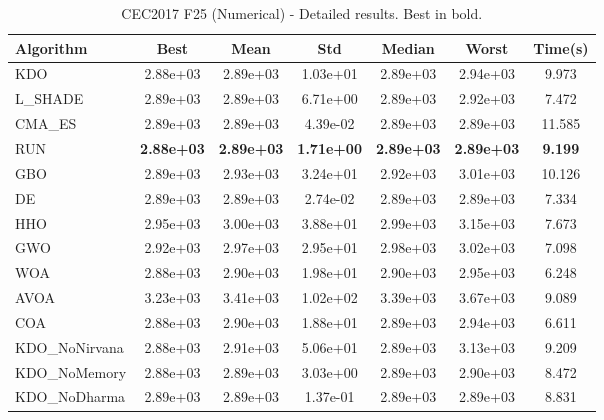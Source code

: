 \begin{table}[H]
\centering\small
\caption{CEC2017 F25 (Numerical) - Detailed results. Best in bold.}
\label{tab:cec2017_F25}
\begin{tabular}{lcccccc}
\toprule
\textbf{Algorithm} & \textbf{Best} & \textbf{Mean} & \textbf{Std} & \textbf{Median} & \textbf{Worst} & \textbf{Time(s)} \\
\midrule
KDO & 2.88e+03 & 2.89e+03 & 1.03e+01 & 2.89e+03 & 2.94e+03 & 9.973 \\
L_SHADE & 2.89e+03 & 2.89e+03 & 6.71e+00 & 2.89e+03 & 2.92e+03 & 7.472 \\
CMA_ES & 2.89e+03 & 2.89e+03 & 4.39e-02 & 2.89e+03 & 2.89e+03 & 11.585 \\
RUN & \textbf{2.88e+03} & \textbf{2.89e+03} & \textbf{1.71e+00} & \textbf{2.89e+03} & \textbf{2.89e+03} & \textbf{9.199} \\
GBO & 2.89e+03 & 2.93e+03 & 3.24e+01 & 2.92e+03 & 3.01e+03 & 10.126 \\
DE & 2.89e+03 & 2.89e+03 & 2.74e-02 & 2.89e+03 & 2.89e+03 & 7.334 \\
HHO & 2.95e+03 & 3.00e+03 & 3.88e+01 & 2.99e+03 & 3.15e+03 & 7.673 \\
GWO & 2.92e+03 & 2.97e+03 & 2.95e+01 & 2.98e+03 & 3.02e+03 & 7.098 \\
WOA & 2.88e+03 & 2.90e+03 & 1.98e+01 & 2.90e+03 & 2.95e+03 & 6.248 \\
AVOA & 3.23e+03 & 3.41e+03 & 1.02e+02 & 3.39e+03 & 3.67e+03 & 9.089 \\
COA & 2.88e+03 & 2.90e+03 & 1.88e+01 & 2.89e+03 & 2.94e+03 & 6.611 \\
KDO_NoNirvana & 2.88e+03 & 2.91e+03 & 5.06e+01 & 2.89e+03 & 3.13e+03 & 9.209 \\
KDO_NoMemory & 2.88e+03 & 2.89e+03 & 3.03e+00 & 2.89e+03 & 2.90e+03 & 8.472 \\
KDO_NoDharma & 2.89e+03 & 2.89e+03 & 1.37e-01 & 2.89e+03 & 2.89e+03 & 8.831 \\
\bottomrule
\end{tabular}
\end{table}
